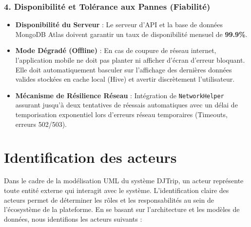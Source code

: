 \documentclass[12pt,a4paper]{report}
\begin{document}
\subsubsection{4. Disponibilité et Tolérance aux Pannes (Fiabilité)}
\begin{itemize}[label=\textbullet]
    \item \textbf{Disponibilité du Serveur} : Le serveur d'API et la base de données MongoDB Atlas doivent garantir un taux de disponibilité mensuel de \textbf{99.9\%}.
    \item \textbf{Mode Dégradé (Offline)} : En cas de coupure de réseau internet, l’application mobile ne doit pas planter ni afficher d'écran d'erreur bloquant. Elle doit automatiquement basculer sur l'affichage des dernières données valides stockées en cache local (Hive) et avertir discrètement l'utilisateur.
    \item \textbf{Mécanisme de Résilience Réseau} : Intégration de \texttt{NetworkHelper} assurant jusqu'à deux tentatives de réessais automatiques avec un délai de temporisation exponentiel lors d'erreurs réseau temporaires (Timeouts, erreurs 502/503).
\end{itemize}

\section{Identification des acteurs}
Dans le cadre de la modélisation UML du système DJTrip, un acteur représente toute entité externe qui interagit avec le système. L'identification claire des acteurs permet de déterminer les rôles et les responsabilités au sein de l'écosystème de la plateforme. En se basant sur l'architecture et les modèles de données, nous identifions les acteurs suivants :
\end{document}
